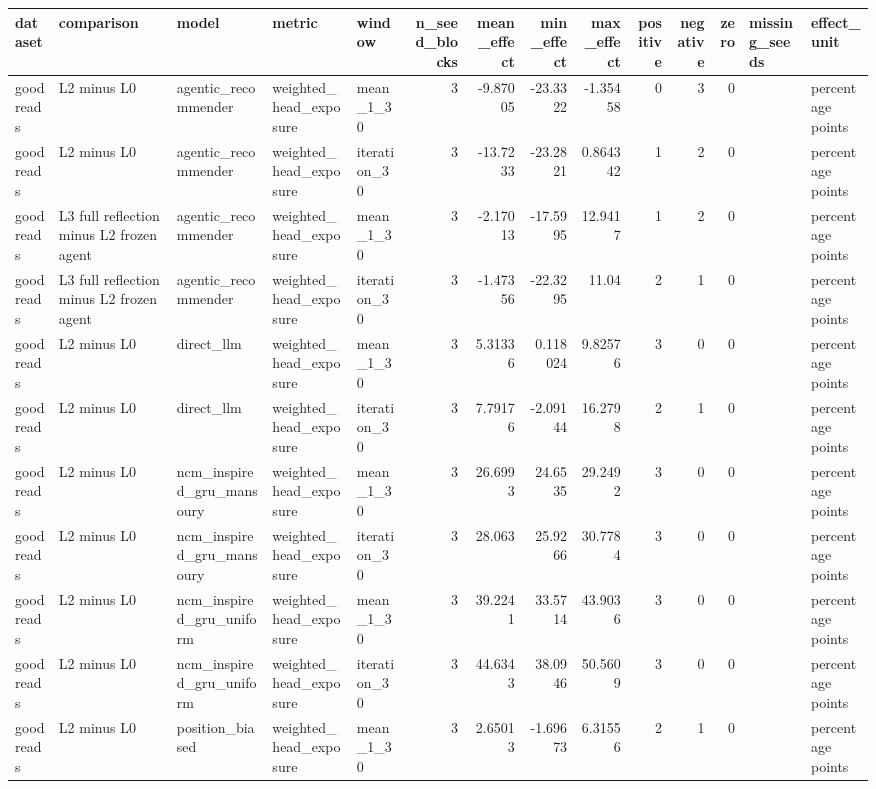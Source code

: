 \begin{table}[htbp!]
\centering
\small
\setlength{\tabcolsep}{3pt}
\renewcommand{\arraystretch}{1.1}
\begin{tabular}{lllllrrrrrrrll}
\hline
dataset & comparison & model & metric & window & n\_seed\_blocks & mean\_effect & min\_effect & max\_effect & positive & negative & zero & missing\_seeds & effect\_unit \\
\hline
goodreads & L2 minus L0 & agentic\_recommender & weighted\_head\_exposure & mean\_1\_30 & 3 & -9.87005 & -23.3322 & -1.35458 & 0 & 3 & 0 &  & percentage points \\
goodreads & L2 minus L0 & agentic\_recommender & weighted\_head\_exposure & iteration\_30 & 3 & -13.7233 & -23.2821 & 0.864342 & 1 & 2 & 0 &  & percentage points \\
goodreads & L3 full reflection minus L2 frozen agent & agentic\_recommender & weighted\_head\_exposure & mean\_1\_30 & 3 & -2.17013 & -17.5995 & 12.9417 & 1 & 2 & 0 &  & percentage points \\
goodreads & L3 full reflection minus L2 frozen agent & agentic\_recommender & weighted\_head\_exposure & iteration\_30 & 3 & -1.47356 & -22.3295 & 11.04 & 2 & 1 & 0 &  & percentage points \\
goodreads & L2 minus L0 & direct\_llm & weighted\_head\_exposure & mean\_1\_30 & 3 & 5.31336 & 0.118024 & 9.82576 & 3 & 0 & 0 &  & percentage points \\
goodreads & L2 minus L0 & direct\_llm & weighted\_head\_exposure & iteration\_30 & 3 & 7.79176 & -2.09144 & 16.2798 & 2 & 1 & 0 &  & percentage points \\
goodreads & L2 minus L0 & ncm\_inspired\_gru\_mansoury & weighted\_head\_exposure & mean\_1\_30 & 3 & 26.6993 & 24.6535 & 29.2492 & 3 & 0 & 0 &  & percentage points \\
goodreads & L2 minus L0 & ncm\_inspired\_gru\_mansoury & weighted\_head\_exposure & iteration\_30 & 3 & 28.063 & 25.9266 & 30.7784 & 3 & 0 & 0 &  & percentage points \\
goodreads & L2 minus L0 & ncm\_inspired\_gru\_uniform & weighted\_head\_exposure & mean\_1\_30 & 3 & 39.2241 & 33.5714 & 43.9036 & 3 & 0 & 0 &  & percentage points \\
goodreads & L2 minus L0 & ncm\_inspired\_gru\_uniform & weighted\_head\_exposure & iteration\_30 & 3 & 44.6343 & 38.0946 & 50.5609 & 3 & 0 & 0 &  & percentage points \\
goodreads & L2 minus L0 & position\_biased & weighted\_head\_exposure & mean\_1\_30 & 3 & 2.65013 & -1.69673 & 6.31556 & 2 & 1 & 0 &  & percentage points \\

\end{tabular}
\end{table}
